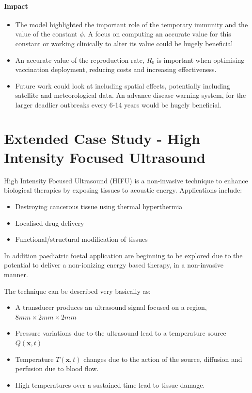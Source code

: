 \documentclass[11pt]{article} %
\begin{document}
\paragraph{Impact}

\begin{itemize}
	\item The model highlighted the important role of the temporary immunity and the value of the constant $\phi$. A focus on computing an accurate value for this constant or working clinically to alter its value could be hugely beneficial
	\item An accurate value of the reproduction rate, $ R_0 $ is important when optimising vaccination deployment, reducing costs and increasing effectiveness. 
	\item Future work could look at including spatial effects, potentially including satellite and meteorological data. An advance disease warning system, for the larger deadlier outbreaks every 6-14 years would be hugely beneficial. 
\end{itemize}
	\pagebreak
	\section{Extended Case Study - High Intensity Focused Ultrasound \label{extended}}
	
	High Intensity Focused Ultrasound (HIFU) is a non-invasive technique to enhance biological therapies by exposing tissues to acoustic energy. Applications include:
	\begin{itemize}
		\item Destroying cancerous tissue using thermal hyperthermia 
		\item Localised drug delivery 
		\item Functional/structural modification of tissues
	\end{itemize}
In addition paediatric foetal application are beginning to be explored due to the potential to deliver a non-ionizing energy based therapy, in a non-invasive manner. 

The technique can be described very basically as: 
	\begin{itemize}
		\item A transducer produces an ultrasound signal focused on a region, $8 mm\times2 mm\times2 mm$
		\item Pressure variations due to the ultrasound lead to a temperature source $Q(\textbf{x},t)$
		\item Temperature $T(\textbf{x},t)$ changes due to the action of the source, diffusion and perfusion due to blood flow. 
		\item High temperatures over a sustained time lead to tissue damage. 
	\end{itemize}
	
\end{document}
